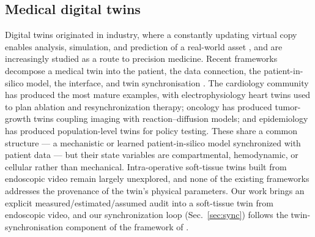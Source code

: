 \documentclass[review]{elsarticle}
\begin{document}
\subsection{Medical digital twins}
Digital twins originated in industry, where a constantly updating virtual
copy enables analysis, simulation, and prediction of a real-world asset
\citep{tao2019,fuller2020}, and are increasingly studied as a route to
precision medicine. Recent frameworks decompose a medical twin into the
patient, the data connection, the patient-in-silico model, the interface,
and twin synchronisation \citep{landig2025,laubenbacher2024}. The
cardiology community has produced the most mature examples, with
electrophysiology heart twins used to plan ablation and resynchronization
therapy; oncology has produced tumor-growth twins coupling imaging with
reaction--diffusion models; and epidemiology has produced population-level
twins for policy testing. These share a common structure --- a mechanistic
or learned patient-in-silico model synchronized with patient data --- but
their state variables are compartmental, hemodynamic, or cellular rather
than mechanical. Intra-operative soft-tissue twins built from endoscopic
video remain largely unexplored, and none of the existing frameworks
addresses the provenance of the twin's physical parameters. Our work brings
an explicit measured/estimated/assumed audit into a soft-tissue twin from
endoscopic video, and our synchronization loop (Sec.~\ref{sec:sync})
follows the twin-synchronisation component of the framework of
\citet{landig2025}.
\end{document}
